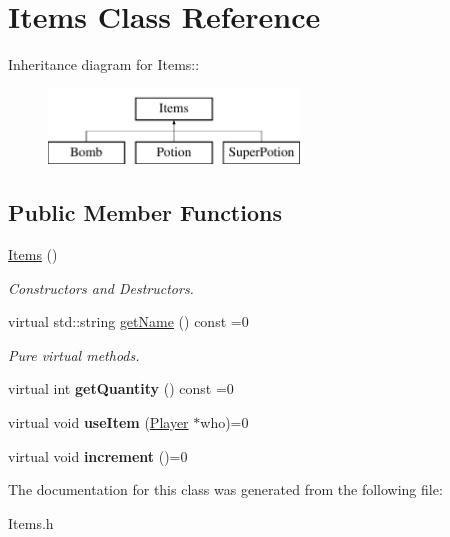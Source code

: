 \hypertarget{classItems}{
\section{Items Class Reference}
\label{classItems}
}
Inheritance diagram for Items::\begin{figure}[H]
\begin{center}
\leavevmode
\includegraphics[height=2cm]{classItems}
\end{center}
\end{figure}
\subsection*{Public Member Functions}
\begin{DoxyCompactItemize}
\item 
\hypertarget{classItems_a3d368c3c7a14eb2a038682bd4da5d41a}{
\hyperlink{classItems_a3d368c3c7a14eb2a038682bd4da5d41a}{Items} ()}
\label{classItems_a3d368c3c7a14eb2a038682bd4da5d41a}

\begin{DoxyCompactList}\small\item\em Constructors and Destructors. \item\end{DoxyCompactList}\item 
\hypertarget{classItems_aa61eb1d6a814abd395776a5f4b63282b}{
virtual std::string \hyperlink{classItems_aa61eb1d6a814abd395776a5f4b63282b}{getName} () const =0}
\label{classItems_aa61eb1d6a814abd395776a5f4b63282b}

\begin{DoxyCompactList}\small\item\em Pure virtual methods. \item\end{DoxyCompactList}\item 
\hypertarget{classItems_ab575aac56a555d99ec836c792559a485}{
virtual int {\bfseries getQuantity} () const =0}
\label{classItems_ab575aac56a555d99ec836c792559a485}

\item 
\hypertarget{classItems_a6e315b13ab669be1cc37e23f185c6d0b}{
virtual void {\bfseries useItem} (\hyperlink{classPlayer}{Player} $\ast$who)=0}
\label{classItems_a6e315b13ab669be1cc37e23f185c6d0b}

\item 
\hypertarget{classItems_a70e74576f122eab10323537dede2de6e}{
virtual void {\bfseries increment} ()=0}
\label{classItems_a70e74576f122eab10323537dede2de6e}

\end{DoxyCompactItemize}


The documentation for this class was generated from the following file:\begin{DoxyCompactItemize}
\item 
Items.h\end{DoxyCompactItemize}
